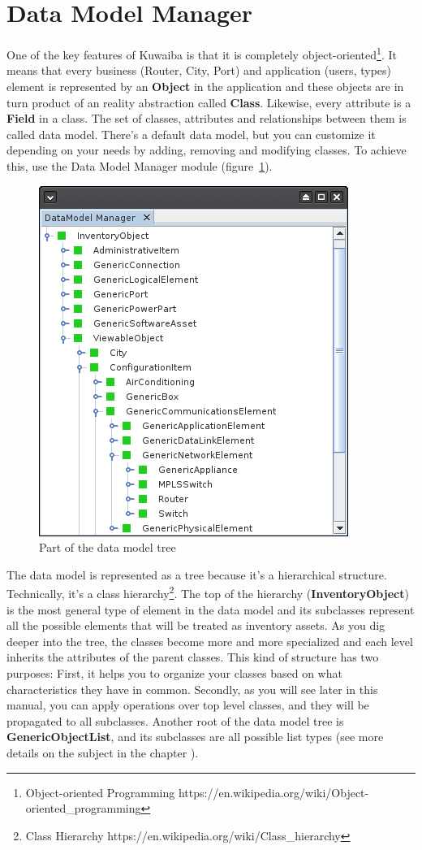 \documentclass[a4paper]{article}
\begin{document}
	\section{Data Model Manager} \label{sec:data_model_manager}
		One of the key features of Kuwaiba is that it is completely object-oriented\footnote{Object-oriented Programming https://en.wikipedia.org/wiki/Object-oriented\_programming}. It means that every business (Router, City, Port) and application (users, types) element is represented by an \textbf{Object} in the application and these objects are in turn product of an reality abstraction called \textbf{Class}. Likewise, every attribute is a \textbf{Field} in a class. The set of classes, attributes and relationships between them is called data model. There's a default data model, but you can customize it depending on your needs by adding, removing and modifying classes. To achieve this, use the Data Model Manager module (figure~\ref{fig:data_model_manager}).
		\begin{figure}[h!]
			\centering
			\includegraphics[width=0.4\linewidth]{img/data_model_manager.png}
			\caption{Part of the data model tree}
			\label{fig:data_model_manager}
		\end{figure}
		The data model is represented as a tree because it's a hierarchical structure. Technically, it's a class hierarchy\footnote{Class Hierarchy https://en.wikipedia.org/wiki/Class\_hierarchy}. The top of the hierarchy (\textbf{InventoryObject}) is the most general type of element in the data model and its subclasses represent all the possible elements that will be treated as inventory assets. As you dig deeper into the tree, the classes become more and more specialized and each level inherits the attributes of the parent classes. This kind of structure has two purposes: First, it helps you to organize your classes based on what characteristics they have in common. Secondly, as you will see later in this manual, you can apply operations over top level classes, and they will be propagated to all subclasses. Another root of the data model tree is \textbf{GenericObjectList}, and its subclasses are all possible list types (see more details on the subject in the chapter \textbf{}).\newline
		
\end{document}
